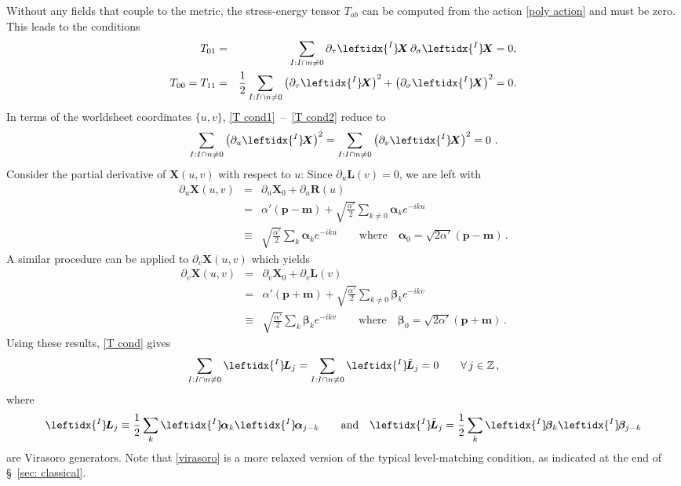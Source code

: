 \documentclass{revtex4}
\newcommand{\be}{\begin{eqnarray}}
\newcommand{\ee}{\end{eqnarray}}
\def\X{\bm{X}}
\def\L{\bm{\lambda}}
\def\a{\bm{a}}
\def\b{\bm{b}}
\def\lI{\leftidx{^I} \! }
\def\L{\bm{L}}
\def\R{\bm{R}}
\def\a{\bm{\alpha}}
\def\b{\bm{\beta}}
\begin{document}
Without any fields that couple to the metric, the stress-energy tensor $T_{ab}$ can be computed from the action \eqref{poly action} and must be zero. This leads to the conditions
\be
\label{T cond1}
T_{01} &=& \sum_{I: I \cap n \neq 0} \partial_\tau \lI \X \,  \partial_\sigma \lI \X = 0 , \\
\label{T cond2}
T_{00} = T_{11} &=& \frac{1}{2} \sum_{I: I \cap n \neq 0} \left( \partial_\tau \lI\X\right)^2 + \left(\partial_\sigma \lI\X \right)^2 = 0.
\ee
In terms of the worldsheet coordinates $\{u, v\}$, \eqref{T cond1}~\!--~\!\eqref{T cond2} reduce to 
\be
\label{T cond}
\sum_{I: I \cap n \neq 0} \left( \partial_u \lI \X \right)^2 = \sum_{I: I \cap n \neq 0} \left( \partial_v \lI \X \right)^2 = 0\ .
\ee
Consider the partial derivative of $\X(u,v)$ with respect to $u$: Since $\partial_u \L(v) = 0$, we are left with
\be
\partial_u \X(u,v) &=& \partial_u \X_0 + \partial_u \R(u) \nonumber \\
			  &=& \alpha' ({\bm p} - {\bm m} ) + \sqrt{\frac{\alpha'}{2}}\sum_{k \neq 0} \a_k e^{-ik u} \nonumber \\
			  &\equiv& \sqrt{\frac{\alpha'}{2}} \sum_k \a_k e^{-iku} \qquad \text{where} \quad \a_0 = \sqrt{2\alpha'} ({\bm p} - {\bm m}) \, .
\ee
A similar procedure can be applied to $\partial_v \X (u,v)$ which yields
\be
\partial_v \X(u,v) &=& \partial_v \X_0 + \partial_v \L(v) \nonumber \\
			  &=& \alpha' ( {\bm p} + {\bm m}) + \sqrt{\frac{\alpha'}{2}} \sum_{k \neq 0} \b_k e^{-ik v} \nonumber \\
			  & \equiv & \sqrt{\frac{\alpha'}{2}} \sum_k \b_k e^{-ikv} \qquad \text{where} \quad \b_0 = \sqrt{2\alpha'} ({\bm p} + {\bm m}) \, .
\ee
Using these results, \eqref{T cond} gives
\be 
\label{virasoro}
\sum_{I: I \cap n \neq 0} \lI {\bm L}_j = \sum_{I: I \cap n \neq 0} \lI \tilde{{\bm L}}_j = 0 \qquad \forall \, j \in \mathbb{Z} \, ,
\ee
where 
\be
\lI {\bm L}_j \equiv \frac{1}{2} \sum_k \lI \a_k \lI \a_{j-k} \qquad \text{and} \quad \lI \tilde{{\bm L}}_j = \frac{1}{2} \sum_k \lI \b_k \lI \b_{j-k}
\ee
are Virasoro generators. Note that \eqref{virasoro} is a more relaxed version of the typical level-matching condition, as indicated at the end of \S~\!\ref{sec: classical}.


\begin{acknowledgments}
\end{acknowledgments}
\end{document}
